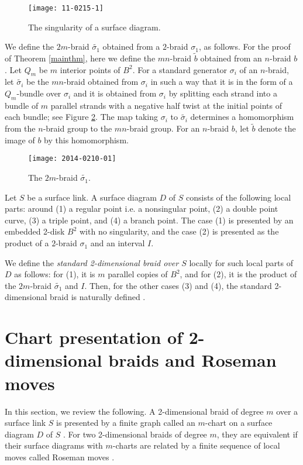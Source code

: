 \documentclass[a4paper,11pt]{amsart}
\numberwithin{equation}{section}
\begin{document}
\begin{figure}
\begin{center}
 \texttt{[image: 11-0215-1]}
\end{center}
  \caption{The singularity of a surface diagram.}
  \label{0215-1}
  \end{figure}

We define the $2m$-braid $\widetilde{\sigma_1}$ obtained from a $2$-braid $\sigma_1$, as follows. For the proof of Theorem \ref{mainthm}, here we define the $mn$-braid $\widetilde{b}$ obtained from an $n$-braid $b$. 
Let $Q_m$ be $m$ interior points of $B^2$. 
For a standard generator $\sigma_i$ of an $n$-braid, let $\widetilde{\sigma_i}$ be the $mn$-braid obtained from $\sigma_i$ in such a way that it is in the form of a $Q_m$-bundle over $\sigma_i$ and it is obtained from $\sigma_i$ by splitting each strand into a bundle of $m$ parallel strands with a negative half twist at the initial points of each bundle; see Figure \ref{fig2014-0210-01}. The map taking $\sigma_i$ to $\widetilde{\sigma_i}$ determines a homomorphism from the $n$-braid group to the $mn$-braid group. For an $n$-braid $b$, let $\widetilde{b}$ denote the image of $b$ by this homomorphism. 

\begin{figure}
\begin{center}
 \texttt{[image: 2014-0210-01]}
\end{center}
  \caption{The $2m$-braid $\widetilde{\sigma_1}$.}
  \label{fig2014-0210-01}
  \end{figure}

\begin{definition}
Let $S$ be a surface link. 
A surface diagram $D$ of $S$ consists of the following local parts: around (1) a regular point i.e. a nonsingular point, (2) a double point curve, (3) a triple point, and (4) a branch point. The case (1) is presented by an embedded 2-disk $B^2$ with no singularity, and the case (2) is presented as the product of a $2$-braid $\sigma_1$ and an interval $I$. 
 
We define the {\it standard 2-dimensional braid over $S$} locally for such local parts of $D$ as follows: for (1), it is $m$ parallel copies of $B^2$, and for (2), it is the product of the $2m$-braid $\widetilde{\sigma_1}$ and $I$. Then, for the other cases (3) and (4), the standard 2-dimensional braid is naturally defined \cite[Definition 5.1 and Proposition 5.2]{N4}. 
\end{definition}

\section{Chart presentation of 2-dimensional braids \newline
and Roseman moves}\label{sec:3}
In this section, we review the following. A 2-dimensional braid of degree $m$ over a surface link $S$ is presented by a finite graph called an $m$-chart on a surface diagram $D$ of $S$ \cite{N4}. For two 2-dimensional braids of degree $m$, they are equivalent if their surface diagrams with $m$-charts are related by a finite sequence of local moves called Roseman moves \cite{N4}. 
\end{document}
